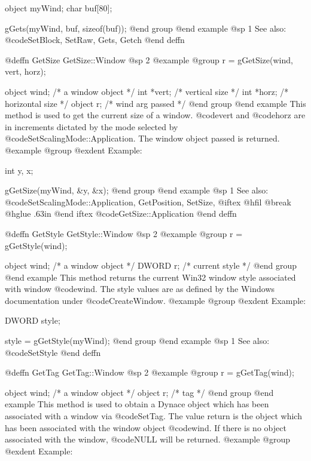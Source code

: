 object  myWind;
char    buf[80];

gGets(myWind, buf, sizeof(buf));
@end group
@end example
@sp 1
See also:  @code{SetBlock, SetRaw, Gets, Getch}
@end deffn












@deffn {GetSize} GetSize::Window
@sp 2
@example
@group
r = gGetSize(wind, vert, horz);

object  wind;   /*  a window object     */
int    *vert;   /*  vertical size       */
int    *horz;   /*  horizontal size     */
object  r;      /*  wind arg passed     */
@end group
@end example
This method is used to get the current size of a window.
@code{vert} and @code{horz} are in increments dictated by the
mode selected by @code{SetScalingMode::Application}.  The window
object passed is returned.
@example
@group
@exdent Example:

int     y, x;

gGetSize(myWind, &y, &x);
@end group
@end example
@sp 1
See also:  @code{SetScalingMode::Application, GetPosition, SetSize,}
@iftex
@hfil @break @hglue .63in 
@end iftex
@code{GetSize::Application}
@end deffn










@deffn {GetStyle} GetStyle::Window
@sp 2
@example
@group
r = gGetStyle(wind);

object  wind;   /*  a window object   */
DWORD   r;      /*  current style     */
@end group
@end example
This method returns the current Win32 window style associated with
window @code{wind}.  The style values are as defined by the Windows
documentation under @code{CreateWindow}.
@example
@group
@exdent Example:

DWORD  style;

style = gGetStyle(myWind);
@end group
@end example
@sp 1
See also:  @code{SetStyle}
@end deffn




@deffn {GetTag} GetTag::Window
@sp 2
@example
@group
r = gGetTag(wind);

object  wind;   /*  a window object   */
object  r;      /*  tag               */
@end group
@end example
This method is used to obtain a Dynace object which has been associated
with a window via @code{SetTag}.  The value return is the object which has
been associated with the window object @code{wind}.  If there is no object
associated with the window, @code{NULL} will be returned.
@example
@group
@exdent Example:

